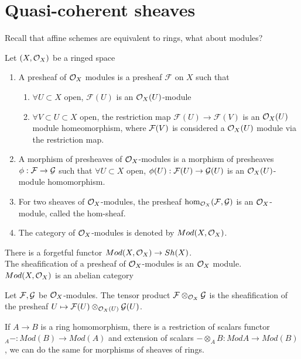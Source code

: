 \documentclass[../main.tex]{subfiles}
\begin{document}
\section{Quasi-coherent sheaves}
Recall that affine schemes are equivalent to rings, what about modules?
\begin{defn}
	Let $( X,\mathcal{O}_X) $ be a ringed space
	\begin{enumerate}
	\item A presheaf of $\mathcal{O}_X$ modules is a presheaf $ \mathcal{F}$ on $X$ such that
		\begin{enumerate}
		\item $\forall U \subset X$ open, $ \mathcal{F}( U) $ is an $\mathcal{O}_X( U)$-module
		\item $\forall V \subset U \subset X$ open, the restriction map $ \mathcal{F}( U) \to \mathcal{F}( V)  $ is an $\mathcal{O}_X( U) $ module homeomorphism, where $\mathcal{F}( V) $ is considered a $\mathcal{O}_X( U) $ module via the restriction map.
		\end{enumerate}

	\item A morphism of presheaves of $\mathcal{O}_X$-modules is a morphism of presheaves $\phi:\mathcal{F} \to \mathcal{G}$ such that $\forall U \subset X$ open, $\phi( U) : \mathcal{F}( U) \to \mathcal{G}( U) $ is an $\mathcal{O}_X( U) $-module homomorphism.
	\item For two sheaves of $\mathcal{O}_X$-modules, the presheaf  $\hom_{\mathcal{O}_X} ( \mathcal{F}, \mathcal{G}) $ is an $\mathcal{O}_X$-module, called the hom-sheaf.
	\item The category of $\mathcal{O}_X$-modules is denoted by $Mod( X,\mathcal{O}_X) $.
	\end{enumerate}
\end{defn}
\begin{rmq}
There is a forgetful functor $Mod( X,\mathcal{O}_X) \to Sh( X) $.\\
The sheafification of a presheaf of $\mathcal{O}_X$-modules is an $\mathcal{O}_X$ module.\\
$Mod( X,\mathcal{O}_X) $ is an abelian category
\end{rmq}
\begin{defn}
	Let $\mathcal{F},\mathcal{G}$ be $\mathcal{O}_X$-modules. The tensor product $\mathcal{F} \otimes_{\mathcal{O}_X} \mathcal{G}$ is the sheafification of the presheaf $ U \mapsto \mathcal{F}( U) \otimes_{\mathcal{O}_X( U)} \mathcal{G}( U) $.
\end{defn}
If $A\to B$ is a ring homomorphism, there is a restriction of scalars functor ${}_A-: Mod( B) \to Mod( A)  $ and extension of scalars $- \otimes_A B: Mod A \to Mod( B) $, we can do the same for morphisms of sheaves of rings.
\end{document}
